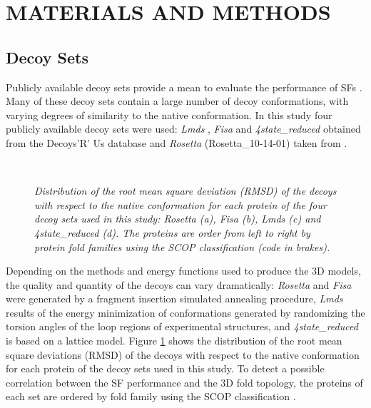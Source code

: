 \documentclass[a4paper,20pt,notitlepage,openbib]{article}
\begin{document}
\section{MATERIALS AND METHODS}
\subsection{Decoy Sets}
Publicly available decoy sets provide a mean to evaluate the performance of SFs  \cite{tsai:decoys, Samudrala:decoyR}. Many of these decoy sets contain 
a large number of decoy conformations, with varying degrees of similarity to the native conformation. In this study four publicly available decoy sets 
were used: \emph{Lmds} \cite{kesar:decoy},  \emph{Fisa} \cite{simons:decoy} and  \emph{4state\_reduced} \cite{parklevit:decoy} obtained from the 
Decoys'R' Us database \cite{url:decoyR} and  \emph{Rosetta} (Rosetta\_10-14-01)  taken from \cite{url:baker}.

%
\begin{figure}
\centering
\mbox{}
\mbox{  \quad
    \quad
    }
\caption{\label{rmsd_dis}\small\textit{Distribution of the root mean square deviation (RMSD) of the decoys with respect to the native conformation for each protein of the four decoy sets used in this study: \emph{Rosetta} (a), \emph{Fisa} (b), \emph{Lmds} (c) and \emph{4state\_reduced} (d). The proteins are order from left to right by protein fold families using the SCOP \cite{scop} classification (code in brakes).}}
\end{figure}
%
Depending on the methods and energy functions used to produce the 3D models, the quality and quantity of the decoys can vary dramatically: \emph{Rosetta} and \emph{Fisa} were generated by a fragment insertion simulated annealing procedure, \emph{Lmds} results of the energy minimization of conformations generated by randomizing the torsion angles of the loop regions of experimental structures, and \emph{4state\_reduced} is based on a lattice model. Figure \ref{rmsd_dis} shows the distribution of the root mean square deviations (RMSD) of the decoys with respect to the native conformation for each protein of the decoy sets used in this study. To detect a possible correlation between the SF performance and the 3D fold topology, the proteins of each set are ordered by fold family using the SCOP classification \cite{scop}.
\end{document}

